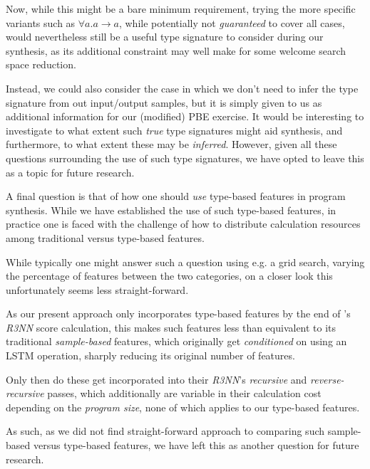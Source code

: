 \documentclass{article}
\begin{document}
    Now, while this might be a bare minimum requirement,
    trying the more specific variants such as $\forall a . a \rightarrow a$,
    while potentially not \emph{guaranteed} to cover all cases,
    would nevertheless still be a useful type signature to consider during our synthesis,
    as its additional constraint may well make for some welcome search space reduction.

    Instead, we could also consider the case in which we don't need to infer the type signature from out input/output samples,
    but it is simply given to us as additional information for our (modified) PBE exercise.
    It would be interesting to investigate to what extent such \emph{true} type signatures
    might aid synthesis, and furthermore, to what extent these may be \emph{inferred}.
    However, given all these questions surrounding the use of such type signatures,
    we have opted to leave this as a topic for future research.

    A final question is that of how one should \emph{use} type-based features in program synthesis.
    While we have established the use of such type-based features,
    in practice one is faced with the challenge of how to distribute calculation resources among traditional versus type-based features.

    While typically one might answer such a question using e.g. a grid search,
    varying the percentage of features between the two categories,
    on a closer look this unfortunately seems less straight-forward.

    As our present approach only incorporates type-based features by the end of \citet{nsps}'s \emph{R3NN} score calculation,
    this makes such features less than equivalent to its traditional \emph{sample-based} features,
    which originally get \emph{conditioned} on using an LSTM operation,
    sharply reducing its original number of features.

    Only then do these get incorporated into their \emph{R3NN}'s \emph{recursive} and \emph{reverse-recursive} passes,
    which additionally are variable in their calculation cost depending on the \emph{program size},
    none of which applies to our type-based features.

    As such, as we did not find straight-forward approach to comparing such sample-based versus type-based features,
    we have left this as another question for future research.

\end{document}
